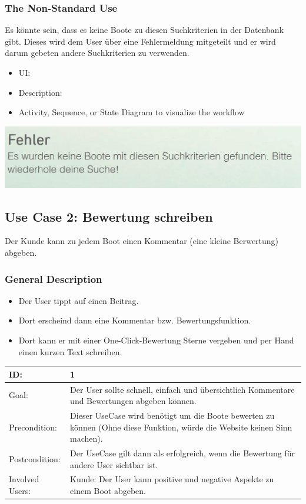 \documentclass[12pt]{article}
\theoremstyle{definition}
\begin{document}
\subsubsection{The Non-Standard Use}
Es könnte sein, dass es keine Boote zu diesen Suchkriterien in der Datenbank gibt. Dieses wird dem User über eine Fehlermeldung mitgeteilt und er wird darum gebeten andere Suchkriterien zu verwenden.
\begin{itemize}
	\item UI:
	\item Description:
	\item Activity, Sequence, or State Diagram to visualize the workflow
\end{itemize}
\includegraphics[height=0.40\textwidth]{Fehler_Suchen.PNG}
\pagebreak

\subsection{Use Case 2: Bewertung schreiben}
Der Kunde kann zu jedem Boot einen Kommentar (eine kleine Berwertung) abgeben.
\subsubsection{General Description}
	\begin{itemize}
		\item Der User tippt auf einen Beitrag.
		\item Dort erscheind dann eine Kommentar bzw. Bewertungsfunktion.
		\item Dort kann er mit einer One-Click-Bewertung Sterne vergeben und per Hand einen kurzen Text schreiben.
	\end{itemize}

\begin{tabular}{|p{.2\linewidth}|p{.65\linewidth}|}
\hline 
ID: & 1 \\ \hline
Goal: & Der User sollte schnell, einfach und übersichtlich Kommentare und Bewertungen abgeben können. \\ \hline
Precondition: & Dieser UseCase wird benötigt um die Boote bewerten zu können (Ohne diese Funktion, würde die Website keinen Sinn machen). \\ \hline
Postcondition: & Der UseCase gilt dann als erfolgreich, wenn die Bewertung für andere User sichtbar ist. \\ \hline
Involved Users: &Kunde: Der User kann positive und negative Aspekte zu einem Boot abgeben. \\ \hline
\end{tabular}
\end{document}
